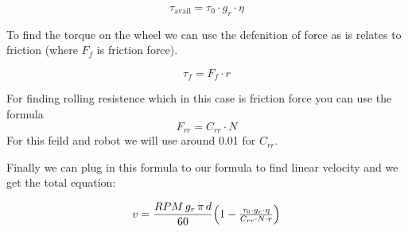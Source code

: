 \documentclass[11pt]{article}
\begin{document}
\[
  \tau_{\mathrm{avail}} = \tau_{0} \cdot g_r \cdot \eta
\]

To find the torque on the wheel we can use the defenition of force as is relates to friction (where \(F_{f}\) is friction force).

\[
  \tau_{f} = F_{f} \cdot r
\]

For finding rolling resistence which in this case is friction force you can use the formula
\[
  F_{rr} = C_{rr} \cdot N
\]
For this feild and robot we will use around 0.01 for \(C_{rr}\).

Finally we can plug in this formula to our formula to find linear velocity and we get the total equation:

\[
  v = \frac{RPM\,g_r\,\pi\,d}{60}\Bigl(1 - \tfrac{\tau_{0} \cdot g_r \cdot \eta}{C_{rr} \cdot N \cdot r}\Bigr)
\]
\end{document}
